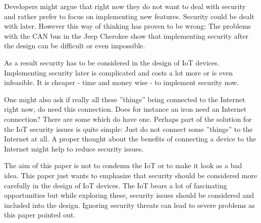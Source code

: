\documentclass[conference]{IEEEtran}
\begin{document}
Developers might argue that right now they do not want to deal with security 
and rather prefer to focus on implementing new features. Security could be 
dealt with later. However this way of thinking has proven to be wrong: The 
problems with the CAN bus in the Jeep Cherokee show that implementing security 
after the design can be difficult or even impossible.

As a result security has to be considered in the design of IoT devices. 
Implementing security later is complicated and costs a lot more or is even 
infeasible. It is cheaper - time and money wise - to implement security now. 

One might also ask if really all these ''things'' being connected to the 
Internet right now, do need this connection. Does for instance an iron need an 
Internet connection? There are some which do have one. Perhaps part of the 
solution for the IoT security issues is quite simple: Just do not connect some 
''things'' to the Internet at all. A proper thought about the benefits of 
connecting a device to the Internet might help to reduce security issues.

The aim of this paper is not to condemn the IoT or to make it look as a bad 
idea. This paper just wants to emphasize that security should be considered 
more carefully in the design of IoT devices. The IoT bears a lot of fascinating 
opportunities but while exploring these, security issues should be considered 
and included into the design. Ignoring security threats can lead to severe 
problems as this paper pointed out.



%
\end{document}
